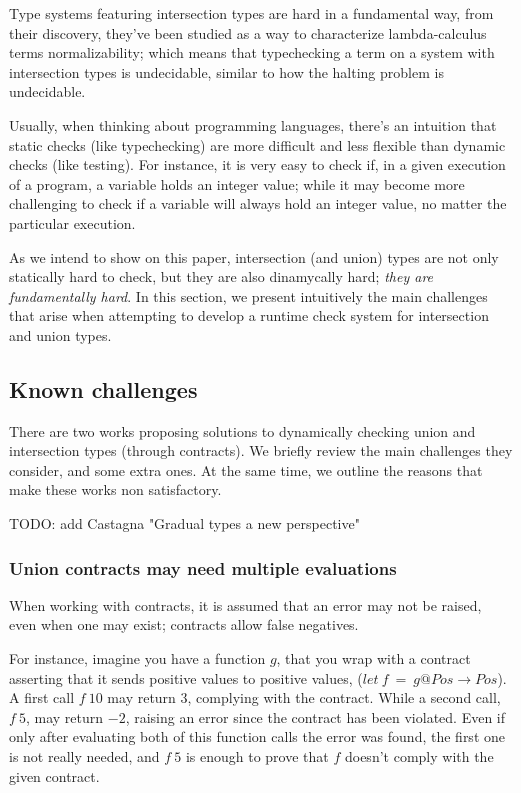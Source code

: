 Type systems featuring intersection types are hard in a fundamental way,
from their discovery, they've been studied as a way to characterize
lambda-calculus terms normalizability; which means that typechecking a
term on a system with intersection types is undecidable,
similar to how the halting problem is undecidable.

Usually, when thinking about programming languages, there's an intuition
that static checks (like typechecking) are more difficult and less flexible
than dynamic checks (like testing). For instance, it is very easy to check if,
in a given execution of a program, a variable holds an integer value; while it
may become more challenging to check if a variable will always hold an integer value,
no matter the particular execution.

As we intend to show on this paper, intersection (and union) types are not only
statically hard to check, but they are also dinamycally hard;
\textit{they are fundamentally hard}.
In this section, we present intuitively the main challenges that arise
when attempting to develop a runtime check system for intersection and
union types.

\subsection{Known challenges}

There are two works proposing solutions to dynamically checking union and intersection
types (through contracts). 
We briefly review the main challenges they consider, and some extra ones.
At the same time, we outline the reasons that make these works non satisfactory.

TODO: add Castagna "Gradual types a new perspective"

\subsubsection*{Union contracts may need multiple evaluations}

When working with contracts, it is assumed that an error may not be raised, even
when one may exist; contracts allow false negatives.

For instance, imagine you have a function $g$, that
you wrap with a contract asserting that it sends positive values to positive values,
($let~f~=~g@Pos \rightarrow Pos$).
A first call $f~10$ may return $3$, complying with the contract.
While a second call, $f~5$, may return $-2$, raising an error since
the contract has been violated.
Even if only after evaluating both of this function calls
the error was found, the first one is not really needed, and $f~5$ is enough to
prove that $f$ doesn't comply with the given contract.

